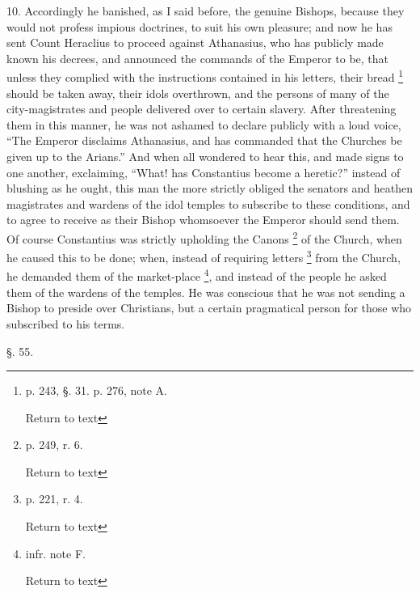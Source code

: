 10. Accordingly he banished, as I said before,
the genuine Bishops, because they would not profess impious doctrines,
to suit his own pleasure; and now he has sent Count Heraclius to
proceed against Athanasius, who has publicly made known his decrees,
and announced the commands of the Emperor to be, that unless they
complied with the instructions contained in his letters, their bread \footnote{p. 243, §. 31. p. 276, note A.

Return to text} should be taken away, their idols overthrown, and the
persons of many of the city-magistrates and people delivered over to
certain slavery. After threatening them in this manner, he was not
ashamed to declare publicly with a loud voice, ``The Emperor
disclaims Athanasius, and has commanded that the Churches be given up
to the Arians.'' And when all wondered to hear this, and made signs
to one another, exclaiming, ``What! has Constantius become a
heretic?'' instead of blushing as he ought, this man the more
strictly obliged the senators and heathen magistrates and wardens of
the idol temples to subscribe to these conditions, and to agree
to receive as their Bishop whomsoever the Emperor should send them. Of
course Constantius was strictly upholding the Canons \footnote{p. 249, r. 6.

Return to text} of the
Church, when he caused this to be done; when, instead of requiring
letters \footnote{p. 221, r. 4.

Return to text} from the Church, he demanded them of the
market-place \footnote{infr. note F.

Return to text}, and instead of the people he asked them of the
wardens of the temples. He was conscious that he was not sending a
Bishop to preside over Christians, but a certain pragmatical person
for those who subscribed to his terms.

§. 55.

